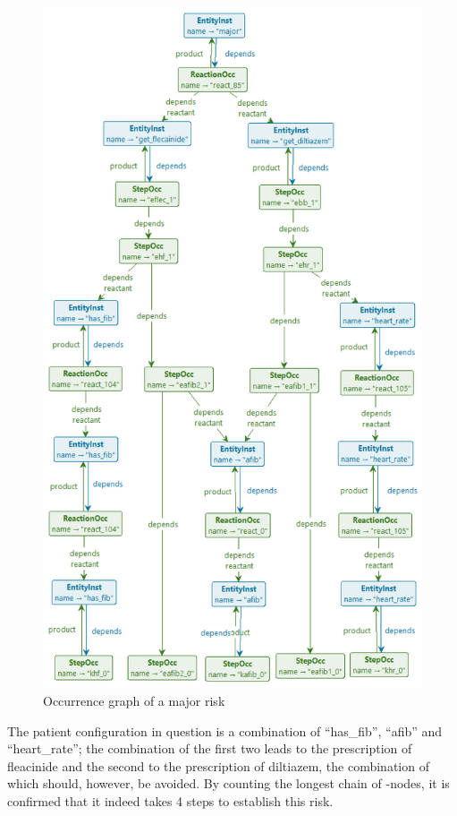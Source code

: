 \begin{figure}
\centering
\includegraphics[scale=.3]{./figs/cmsb-pruned}
\caption{Occurrence graph of a major risk}
\label{fig:cmsb-pruned}
\end{figure}

The patient configuration in question is a combination of ``has\_fib'', ``afib'' and ``heart\_rate''; the combination of the first two leads to the prescription of fleacinide and the second to the prescription of diltiazem, the combination of which should, however, be avoided. By counting the longest chain of \StepOcc-nodes, it is confirmed that it indeed takes 4 steps to establish this risk.

